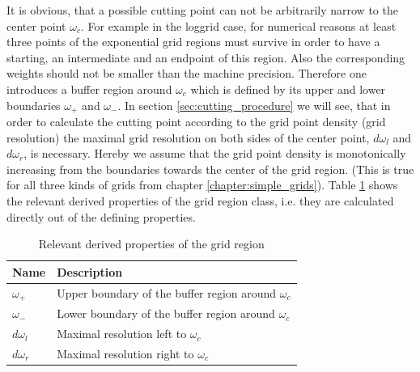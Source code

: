 It is obvious, that a possible cutting point can not be arbitrarily narrow to the center point $\omega_c$. For example in the loggrid case, for numerical reasons at least three points of the exponential grid regions must survive in order to have a starting, an intermediate and an endpoint of this region. Also the corresponding weights should not be smaller than the machine precision. Therefore one introduces a buffer region around $\omega_c$ which is defined by its upper and lower boundaries $\omega_+$ and $\omega_-$. In section \ref{sec:cutting_procedure} we will see, that in order to calculate the cutting point according to the grid point density (grid resolution) the maximal grid resolution on both sides of the center point, $d\omega_l$ and $d\omega_r$, is necessary. Hereby we assume that the grid point density is monotonically increasing from the boundaries towards the center of the grid region. (This is true for all three kinds of grids from chapter \ref{chapter:simple_grids}). Table \ref{tab:grid_region_derived_members} shows the relevant derived properties of the grid region class, i.e. they are calculated directly out of the defining properties.
\begin{table}[h]
	\begin{center}
		\begin{tabular}{ll}
		Name & Description \\ 
		\hline
		$\omega_+$  & Upper boundary of the buffer region around $\omega_c$ \\
		$\omega_-$  & Lower boundary of the buffer region around $\omega_c$ \\
		$d\omega_l$  & Maximal resolution left to $\omega_c$ \\
		$d\omega_r$  & Maximal resolution right to $\omega_c$ \\
		\end{tabular}
	\end{center}
	\caption{Relevant derived properties of the grid region}
	\label{tab:grid_region_derived_members}
\end{table}

